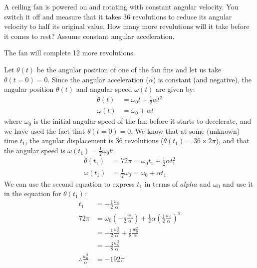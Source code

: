 \question A ceiling fan is powered on and rotating with constant angular velocity. You switch it off and measure that it takes 36 revolutions to reduce its angular velocity to half its original value. How many more revolutions will it take before it comes to rest? Assume constant angular acceleration.
\begin{finalanswer}
The fan will complete 12 more revolutions.
\end{finalanswer}
\begin{solution}
Let $\theta(t)$ be the angular position of one of the fan fins and let us take $\theta(t=0)=0$. Since the angular acceleration ($\alpha$) is constant (and negative), the angular position $\theta(t)$ and angular speed $\omega(t)$ are given by:
\begin{align*}
\theta(t)&=\omega_0t+\frac{1}{2}\alpha t^2\\
\omega(t)&=\omega_0+\alpha t
\end{align*}
where $\omega_0$ is the initial angular speed of the fan before it starts to decelerate, and we have used the fact that $\theta(t=0)=0$. We know that at some (unknown) time $t_1$, the angular displacement is 36 revolutions ($\theta(t_1)=36\times 2\pi$), and that the angular speed is $\omega(t_1)=\frac{1}{2}\omega_0 t$:
\begin{align*}
\theta(t_1)&=72\pi=\omega_0t_1+\frac{1}{2}\alpha t_1^2\\
\omega(t_1)&=\frac{1}{2}\omega_0=\omega_0+\alpha t_1
\end{align*}
We can use the second equation to express $t_1$ in terms of $alpha$ and $\omega_0$ and use it in the equation for $\theta(t_1)$:
\begin{align*}
t_1 &=-\frac{1}{2}\frac{w_0}{\alpha}\\
72\pi &= \omega_0\left(- \frac{1}{2}\frac{w_0}{\alpha}\right)+\frac{1}{2}\alpha \left( \frac{1}{2}\frac{w_0}{\alpha}\right)^2\\
&=-\frac{1}{2}\frac{w_0^2}{\alpha}+\frac{1}{8}\frac{w_0^2}{\alpha}\\
&=-\frac{3}{8}\frac{w_0^2}{\alpha}\\
\therefore \frac{w_0^2}{\alpha} &= -192\pi
\end{align*}


\end{solution}
